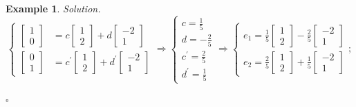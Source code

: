 \documentclass[12pt, a4paper]{article}
\newtheorem{eg}{Example}[subsection]
\newenvironment*{sol}{\indent\textit{Solution. }}{\hfill{$\square$}\par}
\def\d{{\mathrm{d}}}
\begin{document}
\begin{eg}
\begin{sol}
$$\begin{cases}\begin{bmatrix}1\\0\end{bmatrix}&=c\begin{bmatrix}1\\2\end{bmatrix}+d\begin{bmatrix}-2\\1\end{bmatrix}\\\begin{bmatrix}0\\1\end{bmatrix}&=c^{'}\begin{bmatrix}1\\2\end{bmatrix}+d^{'}\begin{bmatrix}-2\\1\end{bmatrix}\end{cases}\Longrightarrow\begin{cases}c=\frac{1}{5}\\d=-\frac{2}{5}\\c^{'}=\frac{2}{5}\\d^{'}=\frac{1}{5}\end{cases}\Longrightarrow\begin{cases} e_1=\frac{1}{5}\begin{bmatrix}1\\2\end{bmatrix}-\frac{2}{5}\begin{bmatrix}-2\\1\end{bmatrix}\\e_2=\frac{2}{5}\begin{bmatrix}1\\2\end{bmatrix}+\frac{1}{5}\begin{bmatrix}-2\\1\end{bmatrix}\end{cases};$$

\end{sol}
\end{eg}
\end{document}
